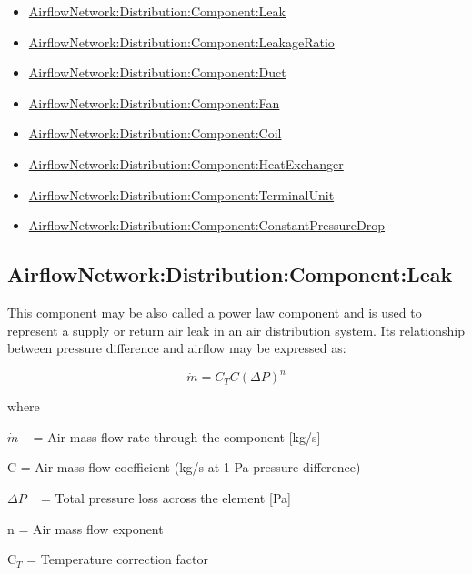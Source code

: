 \begin{itemize}
\item
  \hyperref[airflownetworkdistributioncomponentleak]{AirflowNetwork:Distribution:Component:Leak}
\item
  \hyperref[airflownetworkdistributioncomponentleakageratio]{AirflowNetwork:Distribution:Component:LeakageRatio}
\item
  \hyperref[airflownetworkdistributioncomponentduct]{AirflowNetwork:Distribution:Component:Duct}
\item
  \hyperref[airflownetworkdistributioncomponentfan]{AirflowNetwork:Distribution:Component:Fan}
\item
  \hyperref[airflownetworkdistributioncomponentcoil]{AirflowNetwork:Distribution:Component:Coil}
\item
  \hyperref[airflownetworkdistributioncomponentheatexchanger]{AirflowNetwork:Distribution:Component:HeatExchanger}
\item
  \hyperref[airflownetworkdistributioncomponentterminalunit]{AirflowNetwork:Distribution:Component:TerminalUnit}
\item
  \hyperref[airflownetworkdistributioncomponentconstantpressuredrop]{AirflowNetwork:Distribution:Component:ConstantPressureDrop}
\end{itemize}

\subsection{AirflowNetwork:Distribution:Component:Leak}\label{airflownetworkdistributioncomponentleak}

This component may be also called a power law component and is used to represent a supply or return air leak in an air distribution system. Its relationship between pressure difference and airflow may be expressed as:

\begin{equation}
\dot m = {C_T}C{\left( {\Delta P} \right)^n}
\end{equation}

where

\(\dot m\) ~ = Air mass flow rate through the component {[}kg/s{]}

C = Air mass flow coefficient (kg/s at 1 Pa pressure difference)

\(\Delta P\) ~ = Total pressure loss across the element {[}Pa{]}

n = Air mass flow exponent

C\(_{T}\) = Temperature correction factor

